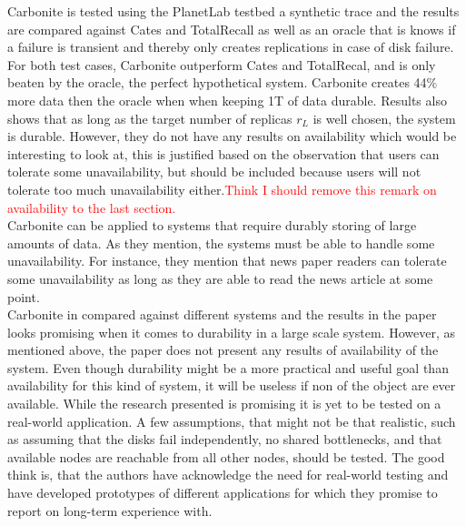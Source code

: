 \documentclass{article}
\begin{document}
\noindent Carbonite is tested using the PlanetLab testbed a synthetic trace and the results are compared against Cates and TotalRecall as well as an oracle that is knows if a failure is transient and thereby only creates replications in case of disk failure. For both test cases, Carbonite outperform Cates and TotalRecal, and is only beaten by the oracle, the perfect hypothetical system. Carbonite creates 44\% more data then the oracle when when keeping 1T of data durable. Results also shows that as long as the target number of replicas $r_L$ is well chosen, the system is durable. However, they do not have any results on availability which would be interesting to look at, this is justified based on the observation that users can tolerate some unavailability, but should be included because users will not tolerate too much unavailability either.\textcolor{red}{Think I should remove this remark on availability to the last section.}\\

\noindent Carbonite can be applied to systems that require durably storing of large amounts of data. As they mention, the systems must be able to handle some unavailability. For instance, they mention that news paper readers can tolerate some unavailability as long as they are able to read the news article at some point.\\

\noindent Carbonite in compared against different systems and the results in the paper looks promising when it comes to durability in a large scale system. However, as mentioned above, the paper does not present any results of availability of the system. Even though durability might be a more practical and useful goal than availability for this kind of system, it will be useless if non of the object are ever available. While the research presented is promising it is yet to be tested on a real-world application. A few assumptions, that might not be that realistic, such as assuming that the disks fail independently, no shared bottlenecks, and that available nodes are reachable from all other nodes, should be tested. The good think is, that the authors have acknowledge the need for real-world testing and have developed prototypes of different applications for which they promise to report on long-term experience with.  \\


\end{document}
